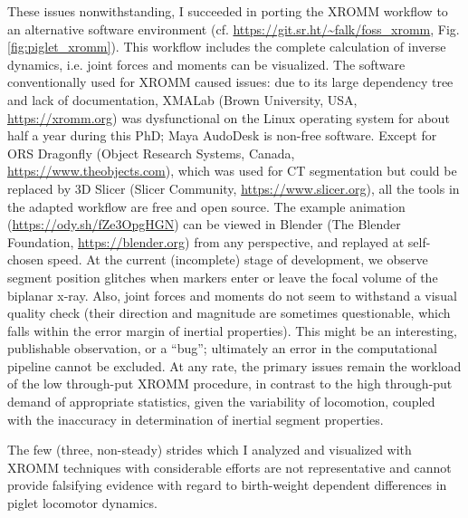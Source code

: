 These issues nonwithstanding, I succeeded in porting the XROMM workflow \citep{Brainerd2010} to an alternative software environment (cf. \url{https://git.sr.ht/\~falk/foss\_xromm}, Fig. \ref{fig:piglet_xromm}).
This workflow includes the complete calculation of inverse dynamics, i.e. joint forces and moments can be visualized.
The software conventionally used for XROMM caused issues: due to its large dependency tree and lack of documentation, XMALab (Brown University, USA, \url{https://xromm.org}) was dysfunctional on the Linux operating system for about half a year during this PhD; Maya AudoDesk is non-free software.
Except for ORS Dragonfly (Object Research Systems, Canada, \url{https://www.theobjects.com}), which was used for CT segmentation but could be replaced by 3D Slicer (Slicer Community, \url{https://www.slicer.org}), all the tools in the adapted workflow are free and open source.
The example animation (\url{https://ody.sh/fZe3OpgHGN}) can be viewed in Blender (The Blender Foundation, \url{https://blender.org}) from any perspective, and replayed at self-chosen speed.
At the current (incomplete) stage of development, we observe segment position glitches when markers enter or leave the focal volume of the biplanar x-ray.
Also, joint forces and moments do not seem to withstand a visual quality check (their direction and magnitude are sometimes questionable, which falls within the error margin of inertial properties).
This might be an interesting, publishable observation, or a ``bug''; ultimately an error in the computational pipeline cannot be excluded.
At any rate, the primary issues remain the workload of the low through-put XROMM procedure, in contrast to the high through-put demand of appropriate statistics, given the variability of locomotion, coupled with the inaccuracy in determination of inertial segment properties.

The few (three, non-steady) strides which I analyzed and visualized with XROMM techniques with considerable efforts are not representative and cannot provide falsifying evidence with regard to birth-weight dependent differences in piglet locomotor dynamics.


